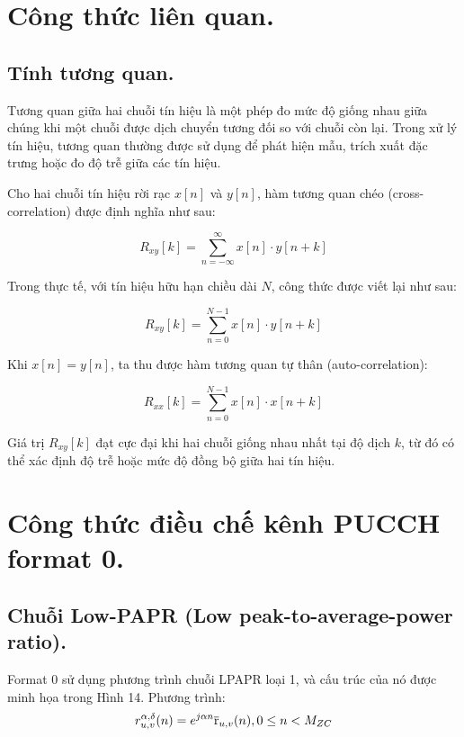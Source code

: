 \section{Công thức liên quan.}


\subsection{Tính tương quan.}
Tương quan giữa hai chuỗi tín hiệu là một phép đo mức độ giống nhau giữa chúng khi một chuỗi được dịch chuyển tương đối so với chuỗi còn lại. Trong xử lý tín hiệu, tương quan thường được sử dụng để phát hiện mẫu, trích xuất đặc trưng hoặc đo độ trễ giữa các tín hiệu.

Cho hai chuỗi tín hiệu rời rạc \( x[n] \) và \( y[n] \), hàm tương quan chéo (cross-correlation) được định nghĩa như sau:

\begin{equation}
R_{xy}[k] = \sum_{n = -\infty}^{\infty} x[n] \cdot y[n + k]
\end{equation}

Trong thực tế, với tín hiệu hữu hạn chiều dài \( N \), công thức được viết lại như sau:

\begin{equation}
R_{xy}[k] = \sum_{n = 0}^{N-1} x[n] \cdot y[n + k]
\end{equation}

Khi \( x[n] = y[n] \), ta thu được hàm tương quan tự thân (auto-correlation):

\begin{equation}
R_{xx}[k] = \sum_{n = 0}^{N-1} x[n] \cdot x[n + k]
\end{equation}

Giá trị \( R_{xy}[k] \) đạt cực đại khi hai chuỗi giống nhau nhất tại độ dịch \( k \), từ đó có thể xác định độ trễ hoặc mức độ đồng bộ giữa hai tín hiệu.

\section{Công thức điều chế kênh PUCCH format 0.}

\subsection{Chuỗi Low-PAPR (Low peak-to-average-power ratio).}
 Format 0 sử dụng phương trình chuỗi LPAPR loại 1, và cấu trúc của nó được minh họa trong Hình 14. Phương trình: 
\[
r^{\alpha ,\delta }_{u,v}(n) = e ^{j\alpha n}\overline{\rm r}_{u,v}(n),   \space 0 \leq n < M_{ZC}
\]
 
